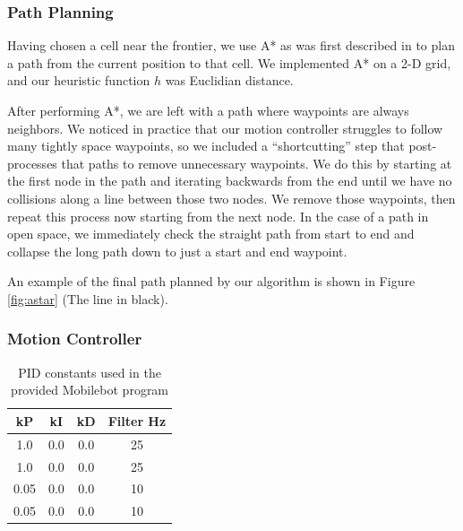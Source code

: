 \documentclass[journal]{IEEEtran}
\begin{document}
        \subsubsection{Path Planning}
        
            Having chosen a cell near the frontier, we use A* as was first described in \cite{Hart1968} to plan a path from the current position to that cell. We implemented A* on a 2-D grid, and our heuristic function $h$ was Euclidian distance.
            
            After performing A*, we are left with a path where waypoints are always neighbors. We noticed in practice that our motion controller struggles to follow many tightly space waypoints, so we included a ``shortcutting'' step that post-processes that paths to remove unnecessary waypoints. We do this by starting at the first node in the path and iterating backwards from the end until we have no collisions along a line between those two nodes. We remove those waypoints, then repeat this process now starting from the next node. In the case of a path in open space, we immediately check the straight path from start to end and collapse the long path down to just a start and end waypoint.
            
            An example of the final path planned by our algorithm is shown in Figure \ref{fig:astar} (The line in black).
        
        \subsubsection{Motion Controller}
            
            \begin{table}[t]
                \centering
                \begin{tabular}{|c|c|c|c|} \hline
                    kP & kI & kD & Filter Hz \\ \hline
                    1.0 & 0.0 & 0.0 & 25 \\ \hline
                    1.0 & 0.0 & 0.0 & 25 \\ \hline
                    0.05 & 0.0 & 0.0 & 10 \\ \hline
                    0.05 & 0.0 & 0.0 & 10 \\ \hline
                \end{tabular}
                \caption{PID constants used in the provided Mobilebot program}
                \label{tab:pid}
            \end{table}
        
\end{document}
